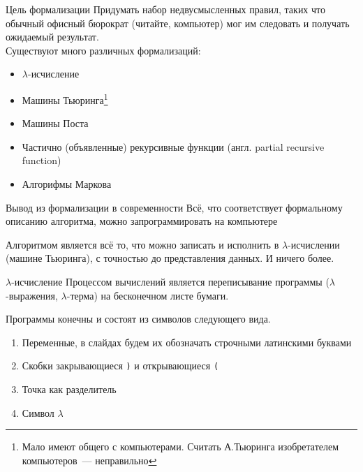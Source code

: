 \begin{frame}{Цель формализации}
Придумать набор недвусмысленных правил, таких что обычный офисный бюрократ (читайте, компьютер) мог им следовать и получать ожидаемый результат.\\

\vspace{1em}
Существуют много различных формализаций:
\begin{itemize}
\item $\lambda$-исчисление
\item Машины Тьюринга\footnote{Мало имеют общего с компьютерами. Считать А.Тьюринга изобретателем компьютеров~--- неправильно}
\item Машины Поста
\item Частично (объявленные) рекурсивные функции (англ. partial recursive function)
\item Алгорифмы Маркова
\end{itemize}
\end{frame}


\begin{frame}{Вывод из формализации в современности}
Всё, что соответствует формальному описанию алгоритма, можно запрограммировать на компьютере

\begin{definition}
Алгоритмом является всё то, что можно записать и исполнить в $\lambda$-исчислении (машине Тьюринга), с точностью до представления данных. И ничего более.
\end{definition}

\end{frame}


\begin{frame}{$\lambda$-исчисление}
Процессом вычислений является переписывание программы ($\lambda$-выражения, $\lambda$-терма) на бесконечном листе бумаги.

\vspace{1em}
Программы конечны и состоят из символов следующего вида.
\begin{enumerate}
\item Переменные, в слайдах будем их обозначать строчными латинскими буквами
\item Скобки закрывающиеся \texttt{)} и открывающиеся \texttt{(}
\item Точка как разделитель
\item Символ $\lambda$
\end{enumerate}
\end{frame}


